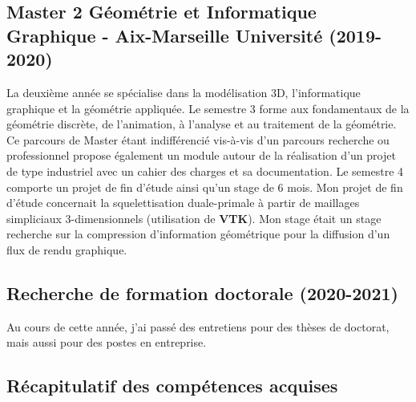 \documentclass[11pt,a4paper,oneside]{article}
\begin{document}
\subsection{Master 2 Géométrie et Informatique Graphique - Aix-Marseille Université (2019-2020)}

La deuxième année se spécialise dans la modélisation 3D, l'informatique
graphique et la géométrie appliquée. %
Le semestre 3 forme aux fondamentaux de la géométrie discrète, de l'animation, à
l'analyse et au traitement de la géométrie. %
Ce parcours de Master étant indifférencié vis-à-vis d'un parcours recherche ou
professionnel propose également un module autour de la réalisation d'un projet
de type industriel avec un cahier des charges et sa documentation. %
Le semestre 4 comporte un projet de fin d'étude ainsi qu'un stage de 6 mois. %
Mon projet de fin d'étude concernait la squelettisation duale-primale à partir
de maillages simpliciaux 3-dimensionnels (utilisation de \textbf{VTK}). Mon
stage était un stage recherche sur la compression d'information géométrique pour
la diffusion d'un flux de rendu graphique. %

\subsection{Recherche de formation doctorale (2020-2021)}
Au cours de cette année, j'ai passé des entretiens pour des thèses de doctorat, mais aussi
pour des postes en entreprise.

\subsection{Récapitulatif des compétences acquises}
\end{document}
